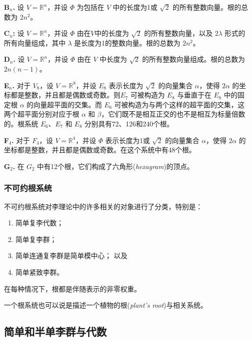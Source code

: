 \documentclass[11pt,fontset=founder]{ctexart}
\begin{document}
\textbf{B$_{n}$.} 设 $V=\mathbb{R}^{n}$，并设 $\Phi $ 为包括在 $V$ 中的长度为1或 $\sqrt{2}$ 的所有整数向量。根的总数为 $2n^{\mathrm{2}}$。

\textbf{C$_{n}$:} 设 $V=\mathbb{R}^{n}$，并设 $\Phi $ 由在$V$中的长度为 $\sqrt{2}$ 的所有整数向量，以及 $2\lambda $ 形式的所有向量组成，其中 $\lambda $ 是长度为1的整数向量。根的总数为 $2n^{\mathrm{2}}$。

\textbf{D$_{n}$.} 设 $V=\mathbb{R}^{n}$，并设 $\Phi $ 由在 $V$ 中长度为 $\sqrt{2}$ 的所有整数向量组成。根的总数为$2n(n-1)$。

\textbf{E$_{n}$.} 对于 $V_{\mathrm{8}}$，设 $V=\mathbb{R}^{8}$，并设 $E_{8}$ 表示长度为 $\sqrt{2}$ 的向量集合 $\alpha $，使得 $2\alpha $ 的坐标都是整数，并且都是偶数或奇数。则$E_{\mathrm{7}}$ 可被构造为 $E_{\mathrm{8}}$ 与垂直于在 $E_{\mathrm{8}}$ 中的固定根 $\alpha $ 的向量超平面的交集。而 $E_{\mathrm{6}}$ 可被构造为与两个这样的超平面的交集，这两个超平面分别对应于根 $\alpha $ 和 $\beta $，它们既不是相互正交的也不是相互为标量倍数的。根系统 $E_{\mathrm{6}}$、$E_{\mathrm{7}}$ 和 $E_{\mathrm{8}}$ 分别具有72、126和240个根。

\textbf{F$_{4}$.} 对于 $F_{\mathrm{4}}$，设 $V=\mathbb{R}^{4}$，并设 $\Phi $ 表示长度为1或 $\sqrt{2}$ 的向量集合 $\alpha $，使得 $2\alpha $ 的坐标都是整数，并且都是偶数或奇数。在这个系统中有48个根。

\textbf{G$_{2}$.} 在 $G_{\mathrm{2}}$ 中有12个根，它们构成了六角形(\emph{hexagram})的顶点。

\subsubsection{不可约根系统}

不可约根系统对李理论中的许多相关的对象进行了分类，特别是：

\begin{enumerate}
\item 简单复李代数；

\item 简单复李群；

\item 简单连通复李群是简单模中心；
以及

\item 简单紧致李群。
\end{enumerate}

在每种情况下，根都是伴随表示的非零权重。

一个根系统也可以说是描述一个植物的根(\emph{plant's root})与相关系统。

\subsection{简单和半单李群与代数}
\end{document}

